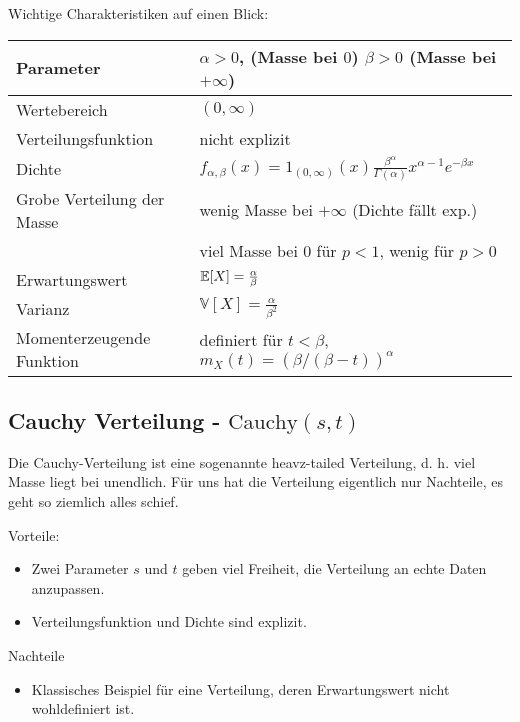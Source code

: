 \documentclass[11pt, a4paper]{book}
\begin{document}
Wichtige Charakteristiken auf einen Blick:
\begin{center}
\begin{tabular}[h]{|l|l|}
\hline
Parameter& $\alpha>0$, (Masse bei $0$) $\beta>0$ (Masse bei $+\infty$)\\
\hline
Wertebereich & $(0,\infty)$\\
\hline
Verteilungsfunktion & nicht explizit\\
\hline
Dichte & $f_{\alpha,\beta}(x)= 1_{(0,\infty)}(x) \frac{\beta^\alpha}{\Gamma(\alpha)} x^{\alpha-1} e^{-\beta x}$\\
\hline
Grobe Verteilung der Masse & wenig Masse bei $+\infty$ (Dichte f\"allt exp.)\\
& viel Masse bei $0$ f\"ur $p<1$, wenig f\"ur $p>0$\\
\hline
Erwartungswert& $\mathbb{E}[X]=\frac{\alpha}{\beta}$ \\
\hline
Varianz & $\mathbb V[X]=\frac{\alpha}{\beta^2}$\\
\hline
Momenterzeugende Funktion& definiert f\"ur $t<\beta$, $m_X(t)=(\beta/(\beta-t))^\alpha$\\
\hline
\end{tabular}
\end{center}


\subsection{Cauchy Verteilung - $\text{Cauchy}(s,t)$}
Die Cauchy-Verteilung ist eine sogenannte \glqq heavz-tailed\grqq{} Verteilung, d. h. viel Masse liegt bei unendlich. F\"ur uns hat die Verteilung eigentlich nur Nachteile, es geht so ziemlich alles schief.

{Vorteile:} 
\begin{itemize}
\item	Zwei Parameter $s$ und $t$ geben viel Freiheit, die Verteilung an echte Daten anzupassen. 
\item Verteilungsfunktion und Dichte sind explizit. 
\end{itemize}

{Nachteile}
\begin{itemize}
	\item Klassisches Beispiel f\"ur eine Verteilung, deren Erwartungswert nicht wohldefiniert ist.
\end{itemize}
\end{document}
